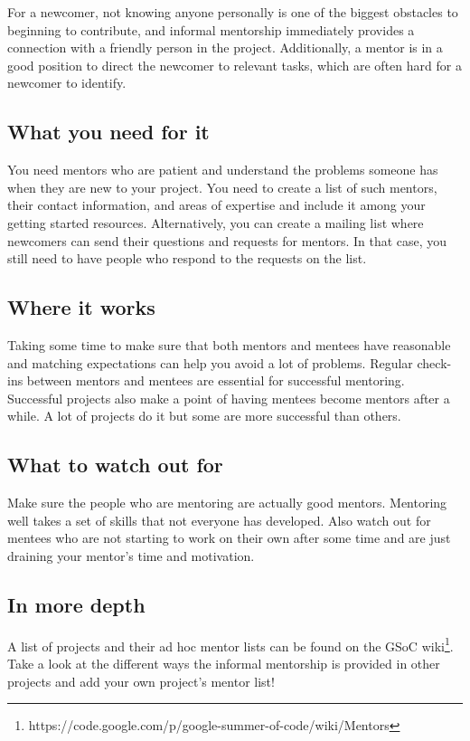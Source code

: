 For a newcomer, not knowing anyone personally is one of the biggest obstacles to beginning to contribute, and informal mentorship immediately provides a connection with a friendly person in the project. Additionally, a mentor is in a good position to direct the newcomer to relevant tasks, which are often hard for a newcomer to identify.

\subsection{What you need for it}
You need mentors who are patient and understand the problems someone has when they are new to your project. You need to create a list of such mentors, their contact information, and areas of expertise and include it among your getting started resources. Alternatively, you can create a mailing list where newcomers can send their questions and requests for mentors. In that case, you still need to have people who respond to the requests on the list.

\subsection{Where it works}
Taking some time to make sure that both mentors and mentees have reasonable and matching expectations can help you avoid a lot of problems. Regular check-ins between mentors and mentees are essential for successful mentoring. Successful projects also make a point of having mentees become mentors after a while. A lot of projects do it but some are more successful than others.

\subsection{What to watch out for}
Make sure the people who are mentoring are actually good mentors. Mentoring well takes a set of skills that not everyone has developed. Also watch out for mentees who are not starting to work on their own after some time and are just draining your mentor’s time and motivation.

\subsection{In more depth}
A list of projects and their ad hoc mentor lists can be found on the GSoC wiki\footnote{{https://code.google.com/p/google-summer-of-code/wiki/Mentors}}. Take a look at the different ways the informal mentorship is provided in other projects and add your own project’s mentor list!

